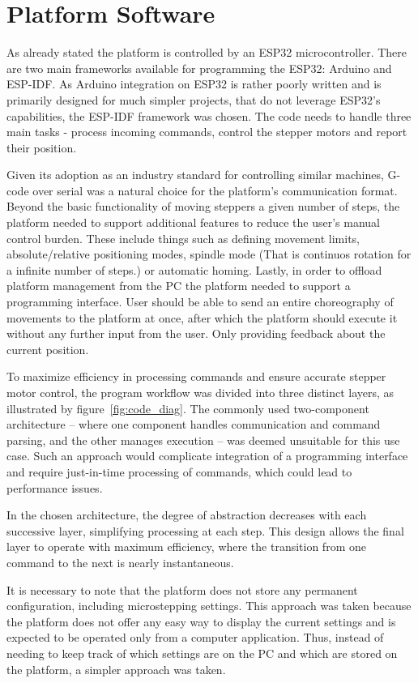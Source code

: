 \section{Platform Software}

As already stated the platform is controlled by an ESP32 microcontroller.
There are two main frameworks available for programming the ESP32: Arduino and ESP-IDF.
As Arduino integration on ESP32 is rather poorly written and is primarily designed for much simpler projects, that do not leverage ESP32's capabilities, the ESP-IDF framework was chosen.
The code needs to handle three main tasks - process incoming commands, control the stepper motors and report their position.

Given its adoption as an industry standard for controlling similar machines, G-code over serial was a natural choice for the platform's communication format.
Beyond the basic functionality of moving steppers a given number of steps, the platform needed to support additional features to reduce the user's manual control burden.
These include things such as defining movement limits, absolute/relative positioning modes, spindle mode (That is continuos rotation for a infinite number of steps.) or automatic homing.
Lastly, in order to offload platform management from the PC the platform needed to support a programming interface.
User should be able to send an entire choreography of movements to the platform at once, after which the platform should execute it without any further input from the user.
Only providing feedback about the current position.

To maximize efficiency in processing commands and ensure accurate stepper motor control, the program workflow was divided into three distinct layers, as illustrated by figure~\ref{fig:code_diag}.
The commonly used two-component architecture -- where one component handles communication and command parsing, and the other manages execution -- was deemed unsuitable for this use case.
Such an approach would complicate integration of a programming interface and require just-in-time processing of commands, which could lead to performance issues.

In the chosen architecture, the degree of abstraction decreases with each successive layer, simplifying processing at each step.
This design allows the final layer to operate with maximum efficiency, where the transition from one command to the next is nearly instantaneous.

It is necessary to note that the platform does not store any permanent configuration, including microstepping settings.
This approach was taken because the platform does not offer any easy way to display the current settings and is expected to be operated only from a computer application.
Thus, instead of needing to keep track of which settings are on the PC and which are stored on the platform, a simpler approach was taken.

